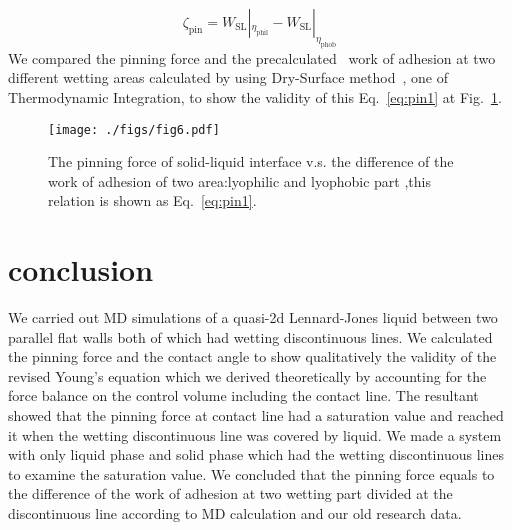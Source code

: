 \begin{equation}
\zeta_{\text{pin}}=W_{\text{SL}}|_{\eta_{\text{phil}}}-W_{\text{SL}}|_{\eta_{\text{phob}}}
\label{eq:pin1}
\end{equation}
We compared the pinning force and 
the precalculated~\cite{Yamaguchi2019} work of adhesion at two different wetting areas calculated by using Dry-Surface method~\cite{Leroy2015},
one of Thermodynamic Integration,
to show the validity of this Eq.~\eqref{eq:pin1} at Fig.~\ref{fig:pinSL}.
\begin{figure}
  \begin{center}
    \texttt{[image: ./figs/fig6.pdf]}
  \end{center} 
  \caption{\label{fig:pinSL}
    The pinning force of solid-liquid interface v.s. the difference of the work of adhesion of two area:lyophilic and lyophobic part
,this relation is shown as Eq.~\eqref{eq:pin1}.
  }
\end{figure}

\section{conclusion}
We carried out MD simulations of a quasi-2d Lennard-Jones liquid 
between two parallel flat walls both of which had wetting discontinuous lines.
We calculated the pinning force and the contact angle%
to show qualitatively
 the validity of the revised Young's equation which we derived theoretically
by accounting for the force balance on the control volume including the contact line.
The resultant showed that the pinning force at contact line had a saturation value and reached it
when the wetting discontinuous line was covered by liquid.
We made a system with only liquid phase and solid phase which had the wetting discontinuous lines
to examine the saturation value.
We concluded that the pinning force equals to the difference of the work of adhesion 
at two wetting part divided at the discontinuous line according to MD calculation and our old research data.


